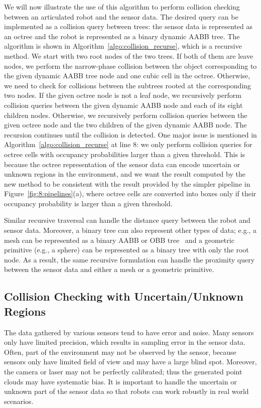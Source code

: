We will now illustrate the use of this algorithm to perform collision
checking between an articulated
robot and the sensor data. The desired query can be implemented as a collision
query between trees: the sensor data is represented as an octree and
the robot is represented as a binary dynamic AABB tree. The algorithm
is shown in Algorithm~\ref{algo:collision_recurse}, which is a
recursive method. We start with two root nodes of the two trees. If
both of them are leave nodes, we perform the narrow-phase collision
between the object corresponding to the given dynamic AABB tree node
and one cubic cell in the octree. Otherwise, we need to check for
collisions between the subtrees rooted at the corresponding two nodes. If the
given octree node is not a leaf node, we recursively perform collision queries
between the given dynamic AABB
node and each of its eight children nodes. Otherwise, we recursively perform collision queries between the given
octree node and the two children of the given dynamic AABB node. The
recursion continues until the collision is detected. One major issue is mentioned in Algorithm~\ref{algo:collision_recurse} at line $8$: we only perform
collision queries for octree cells with occupancy probabilities larger than a
given threshold. This is because the octree representation of the sensor data can encode uncertain or
unknown regions in the environment, and we want the result computed by
the new method to be consistent with the result provided by the simpler
pipeline in Figure~\ref{fig:8:pipelines}(a), where octree cells are
converted into boxes only if their occupancy probability is larger
than a given threshold.

Similar recursive traversal can handle the distance
query between the robot and sensor data. Moreover, a binary tree
can also represent other types of data; e.g., a mesh can be
represented as a binary AABB or OBB tree~\cite{Pan:ICRA:2012} and a
geometric primitive (e.g., a sphere) can be represented as a binary
tree with only the root node. As a result, the same recursive formulation can handle the proximity query between the sensor data and
either a mesh or a geometric primitive.


\subsection{Collision Checking with Uncertain/Unknown Regions}
The data gathered by various sensors tend to have error and noise.
Many sensors only have limited precision, which results in sampling
error in the sensor data. Often, part of the environment may not be
observed by the sensor, because sensors only have limited field of
view and may have a large blind spot. Moreover, the camera or laser
may not be perfectly calibrated; thus the generated point clouds
may have systematic bias. It is important to handle the uncertain or
unknown part of the sensor data so that robots can work robustly in
real world scenarios.

